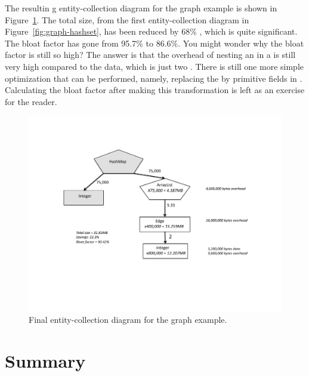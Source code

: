 The resultin g entity-collection diagram for the graph example is shown in
Figure~\ref{fig:arraylist-to-array}. The total size, from the first
entity-collection diagram in Figure~\ref{fig:graph-hashset}, has been reduced
by 68\% , which is quite significant. The bloat factor has gone from 95.7\% to
86.6\%. You might wonder why the bloat factor is still so high? The answer
is that the overhead of nesting an  in a  is
still very high compared to the data, which is just two . There
is still one more simple optimization that can be performed, namely, replacing
the  by primitive  fields in .
Calculating the bloat factor after making this transformation is left as an
exercise for the reader.
\begin{figure}
  \centering
 \includegraphics[width=.80\textwidth]{part1/Figures/collections/arraylist-to-array.pdf}
  \caption{Final entity-collection diagram for the graph example.}
  \label{fig:arraylist-to-array}
\end{figure}

\section{Summary}

